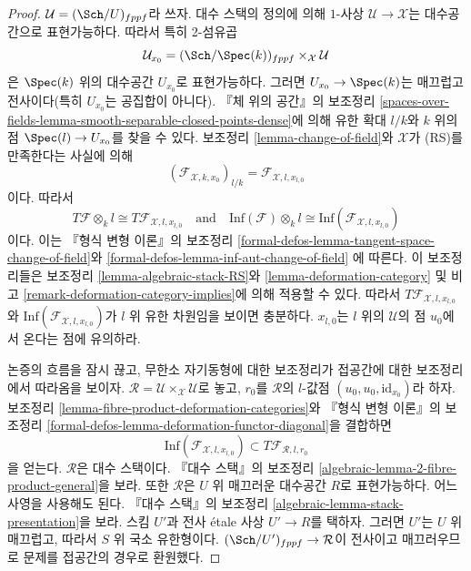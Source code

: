 \begin{proof}
$\mathcal{U} = (\Sch/U)_{fppf}$라 쓰자. 대수 스택의 정의에 의해
$1$-사상 $\mathcal{U} \to \mathcal{X}$는 대수공간으로 표현가능하다.
따라서 특히 2-섬유곱
$$
\mathcal{U}_{x_0} = (\Sch/\Spec(k))_{fppf} \times_\mathcal{X} \mathcal{U}
$$
은 $\Spec(k)$ 위의 대수공간 $U_{x_0}$로 표현가능하다. 그러면
$U_{x_0} \to \Spec(k)$는 매끄럽고 전사이다(특히 $U_{x_0}$는 공집합이
아니다). 『체 위의 공간』의 보조정리
\ref{spaces-over-fields-lemma-smooth-separable-closed-points-dense}에 의해
유한 확대 $l/k$와 $k$ 위의 점 $\Spec(l) \to U_{x_0}$를 찾을 수 있다.
보조정리 \ref{lemma-change-of-field}와 $\mathcal{X}$가 (RS)를 만족한다는
사실에 의해
$$
(\mathcal{F}_{\mathcal{X}, k , x_0})_{l/k} =
\mathcal{F}_{\mathcal{X}, l, x_{l, 0}}
$$
이다. 따라서
$$
T\mathcal{F} \otimes_k l \cong T\mathcal{F}_{\mathcal{X}, l, x_{l, 0}}
\quad\text{and}\quad
\text{Inf}(\mathcal{F}) \otimes_k l \cong
\text{Inf}(\mathcal{F}_{\mathcal{X}, l, x_{l, 0}})
$$
이다. 이는 『형식 변형 이론』의 보조정리
\ref{formal-defos-lemma-tangent-space-change-of-field}와
\ref{formal-defos-lemma-inf-aut-change-of-field}
에 따른다. 이 보조정리들은 보조정리 \ref{lemma-algebraic-stack-RS}와
\ref{lemma-deformation-category} 및 비고
\ref{remark-deformation-category-implies}에 의해 적용할 수 있다.
따라서 $T\mathcal{F}_{\mathcal{X}, l, x_{l, 0}}$와
$\text{Inf}(\mathcal{F}_{\mathcal{X}, l, x_{l, 0}})$가 $l$ 위 유한
차원임을 보이면 충분하다. $x_{l, 0}$는 $l$ 위의 $\mathcal{U}$의 점
$u_0$에서 온다는 점에 유의하라.

\medskip\noindent
논증의 흐름을 잠시 끊고, 무한소 자기동형에 대한 보조정리가 접공간에 대한
보조정리에서 따라옴을 보이자.
$\mathcal{R} = \mathcal{U} \times_\mathcal{X} \mathcal{U}$로 놓고,
$r_0$를 $\mathcal{R}$의 $l$-값점 $(u_0, u_0, \text{id}_{x_0})$라 하자.
보조정리 \ref{lemma-fibre-product-deformation-categories}와
『형식 변형 이론』의 보조정리
\ref{formal-defos-lemma-deformation-functor-diagonal}을 결합하면
$$
\text{Inf}(\mathcal{F}_{\mathcal{X}, l, x_{l, 0}})
\subset
T\mathcal{F}_{\mathcal{R}, l, r_0}
$$
을 얻는다. $\mathcal{R}$은 대수 스택이다. 『대수 스택』의 보조정리
\ref{algebraic-lemma-2-fibre-product-general}을 보라. 또한
$\mathcal{R}$은 $U$ 위 매끄러운 대수공간 $R$로 표현가능하다. 어느
사영을 사용해도 된다. 『대수 스택』의 보조정리
\ref{algebraic-lemma-stack-presentation}을 보라.
스킴 $U'$과 전사 \'etale 사상 $U' \to R$를 택하자. 그러면 $U'$는
$U$ 위 매끄럽고, 따라서 $S$ 위 국소 유한형이다.
$(\Sch/U')_{fppf} \to \mathcal{R}$이 전사이고 매끄러우므로 문제를
접공간의 경우로 환원했다.


\end{proof}
